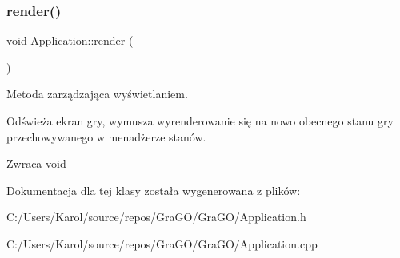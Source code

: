 \subsubsection{render()}
{\footnotesize\ttfamily void Application\+::render (\begin{DoxyParamCaption}{ }\end{DoxyParamCaption})}



Metoda zarządzająca wyświetlaniem. 

Odświeża ekran gry, wymusza wyrenderowanie się na nowo obecnego stanu gry przechowywanego w menadżerze stanów. \begin{DoxyReturn}{Zwraca}
void 
\end{DoxyReturn}


Dokumentacja dla tej klasy została wygenerowana z plików\+:\begin{DoxyCompactItemize}
\item 
C\+:/\+Users/\+Karol/source/repos/\+Gra\+G\+O/\+Gra\+G\+O/Application.\+h\item 
C\+:/\+Users/\+Karol/source/repos/\+Gra\+G\+O/\+Gra\+G\+O/Application.\+cpp\end{DoxyCompactItemize}
